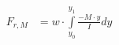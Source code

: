 \documentclass[preview,convert={density=300,outext=.png}]{standalone}
\begin{document}
\begin{align}
  F_{r,M} &= w\cdot \int\limits_{y_0}^{y_1} \frac{-M\cdot y}{I} dy
  \tag{6}
\end{align}
\end{document}
